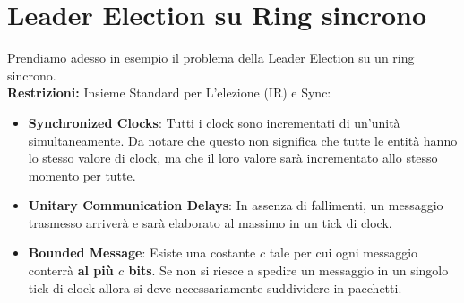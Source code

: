 \section{Leader Election su Ring sincrono}
Prendiamo adesso in esempio il problema della Leader Election su un ring
sincrono.\\
\textbf{Restrizioni:} Insieme Standard per L'elezione (IR) e Sync:
\begin{itemize}
    \item \textbf{Synchronized Clocks}: Tutti i clock sono incrementati di
          un'unità simultaneamente. Da notare che questo non significa che tutte le
          entità hanno lo stesso valore di clock, ma che il loro valore sarà
          incrementato allo stesso momento per tutte.
    \item \textbf{Unitary Communication Delays}: In assenza di fallimenti, un
          messaggio trasmesso arriverà e sarà elaborato al massimo in un tick di clock.
    \item \textbf{Bounded Message}: Esiste una costante $c$ tale per cui ogni
          messaggio conterrà \textbf{al più $c$ bits}. Se non si riesce a spedire un
          messaggio in un singolo tick di clock allora si deve necessariamente
          suddividere in pacchetti.
\end{itemize}


